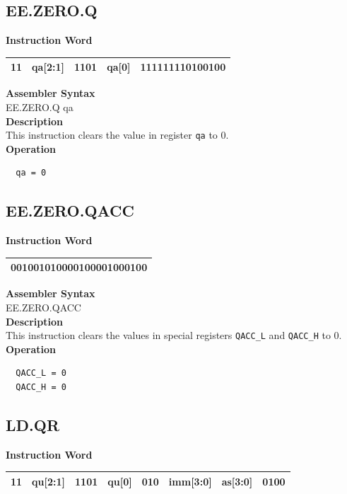 \clearpage
\subsection{EE.ZERO.Q}\label{instruction:EEZEROQ}
\setlength\tabcolsep{6pt}
\textbf{Instruction Word} \\
\begin{tabular}{|c|c|c|c|c|}
	\hline
	11 & qa[2:1] & 1101 & qa[0] & 111111110100100 \\
	\hline
\end{tabular}

\textbf{Assembler Syntax} \\
EE.ZERO.Q qa \\
\textbf{Description} \\
This instruction clears the value in register \lstinline{qa} to 0.\\
\textbf{Operation}
\begin{lstlisting}
  qa = 0
\end{lstlisting}

\clearpage
\subsection{EE.ZERO.QACC}\label{instruction:EEZEROQACC}
\setlength\tabcolsep{6pt}
\textbf{Instruction Word} \\
\begin{tabular}{|c|}
	\hline
	001001010000100001000100 \\
	\hline
\end{tabular}

\textbf{Assembler Syntax} \\
EE.ZERO.QACC  \\
\textbf{Description} \\
This instruction clears the values in special registers \lstinline{QACC_L} and \lstinline{QACC_H} to 0.\\
\textbf{Operation}
\begin{lstlisting}
  QACC_L = 0
  QACC_H = 0
\end{lstlisting}


\clearpage
\subsection{LD.QR}\label{instruction:LDQR}
\setlength\tabcolsep{6pt}
\textbf{Instruction Word} \\
\begin{tabular}{|c|c|c|c|c|c|c|c|}
	\hline
	11 & qu[2:1] & 1101 & qu[0] & 010 & imm[3:0] & as[3:0] & 0100 \\
	\hline
\end{tabular}

